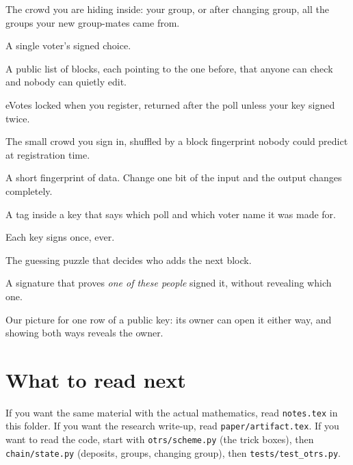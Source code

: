 \documentclass[11pt,a4paper]{article}
\begin{document}
\begin{description}[leftmargin=1.2em, style=nextline, font=\bfseries]
  \item[Anonymity set] The crowd you are hiding inside: your group, or after
        changing group, all the groups your new group-mates came from.
  \item[Ballot] A single voter's signed choice.
  \item[Blockchain] A public list of blocks, each pointing to the one
        before, that anyone can check and nobody can quietly edit.
  \item[Deposit] eVotes locked when you register, returned after the poll
        unless your key signed twice.
  \item[Group] The small crowd you sign in, shuffled by a block fingerprint
        nobody could predict at registration time.
  \item[Hash (``lottery machine'')] A short fingerprint of data. Change one
        bit of the input and the output changes completely.
  \item[Key label] A tag inside a key that says which poll and which voter
        name it was made for.
  \item[One-time] Each key signs once, ever.
  \item[Proof of work] The guessing puzzle that decides who adds the next
        block.
  \item[Ring signature] A signature that proves \emph{one of these people}
        signed it, without revealing which one.
  \item[Trick box] Our picture for one row of a public key: its owner can
        open it either way, and showing both ways reveals the owner.
\end{description}

\section*{What to read next}

If you want the same material with the actual mathematics, read
\texttt{notes.tex} in this folder. If you want the research write-up, read
\texttt{paper/artifact.tex}. If you want to read the code, start with
\texttt{otrs/scheme.py} (the trick boxes), then \texttt{chain/state.py}
(deposits, groups, changing group), then \texttt{tests/test\_otrs.py}.
\end{document}
